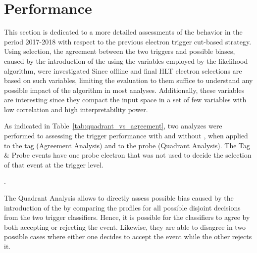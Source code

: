 
\chapter{\rnn{} Performance}%
\label{sec:off_ana}

This section is dedicated to a more detailed assessments of the \rnn{} behavior 
in the period 2017-2018 with respect to the previous electron trigger cut-based strategy.
Using \Zee{} \tnp{} selection, the agreement between the two triggers and
possible biases, caused by the introduction of the \rnn{} using the variables
employed by the likelihood algorithm, were investigated
Since offline and final HLT electron
selections are based on such variables, limiting the evaluation to them suffice
to understand any possible impact of the \rnn{} algorithm in most analyses.
Additionally, these variables are interesting since they compact the input space
in a set of few variables with low correlation and high interpretability power. 

As indicated in Table~\ref{tab:quadrant_vs_agreement}, two analyzes were performed to assessing the
trigger performance with and without \rnn{}, when applied to the tag (Agreement Analysis) and
to the probe (Quadrant Analysis). The Tag \& Probe events have one probe electron that was not 
used to decide the selection of that event at the trigger level.


\begin{table}[ht!]\footnotesize
\centering
\caption{Customized \Zee{} \tap{} selection criteria employed in the
agreement and quadrant analyses in the Run 2 (2017-2018 period)}.%
\label{tab:quadrant_vs_agreement}
\end{table}

The Quadrant Analysis allows to directly assess possible bias caused by the
introduction of the \rnn{} by comparing the profiles for all possible disjoint
decisions from the two trigger classifiers. Hence, it is possible for the classifiers
to agree by both accepting or rejecting the event. Likewise, they are able to
disagree in two possible cases where either one decides to accept the event
while the other rejects it.

